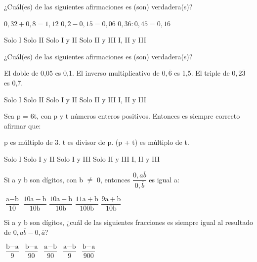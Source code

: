 \documentclass[pagina vacia]{srs}
\begin{document}
\begin{preguntas}[after-item-skip=1cm]
\pregunta ¿Cuál(es) de las siguientes afirmaciones es (son) verdadera(s)?
\begin{verticali}
\alternativa \( 0,32 + 0,8 = 1,12 \)
\alternativa \( 0,2 - 0,1\overline{5} = 0,0\overline{6} \)
\alternativa \( 0,36 : 0,45 = 0,16 \)
\end{verticali}
\begin{vertical}
\alternativa Solo I
\alternativa Solo II
\alternativa Solo I y II
\alternativa Solo II y III
\alternativa I, II y III
\end{vertical}

\pregunta ¿Cuál(es) de las siguientes afirmaciones es (son) verdadera(s)?
\begin{verticali}
\alternativa El doble de 0,05 es 0,1.
\alternativa El inverso multiplicativo de \(0,\overline{6}\) es 1,5.
\alternativa El triple de \(0,2\overline{3}\) es 0,7.
\end{verticali}
\begin{vertical}
\alternativa Solo I
\alternativa Solo II
\alternativa Solo I y II
\alternativa Solo II y III
\alternativa I, II y III
\end{vertical}

\pregunta Sea p = 6t, con p y t números enteros positivos. Entonces es siempre correcto afirmar que:
\begin{verticali}
\alternativa p es múltiplo de 3.
\alternativa t es divisor de p.
\alternativa (p + t) es múltiplo de t.
\end{verticali}
\begin{vertical}
\alternativa Solo I
\alternativa Solo I y II
\alternativa Solo I y III
\alternativa Solo II y III
\alternativa I, II y III
\end{vertical}

\pregunta Si a y b son dígitos, con b \( \neq \) 0, entonces \( \dfrac{0,a\overline{b}}{0,\overline{b}} \) es igual a:
\begin{vertical}
\alternativa \( \dfrac{\text{a} - \text{b}}{10} \)
\alternativa \( \dfrac{10\text{a} - \text{b}}{10\text{b}} \)
\alternativa \( \dfrac{10\text{a} + \text{b}}{10\text{b}} \)
\alternativa \( \dfrac{11\text{a} + \text{b}}{100\text{b}} \)
\alternativa \( \dfrac{9\text{a} + \text{b}}{10\text{b}} \)
\end{vertical}

\pregunta Si a y b son dígitos, ¿cuál de las siguientes fracciones es siempre igual al resultado de \(0,a\overline{b} - 0,\overline{a}\)?
\begin{vertical}
\alternativa \( \dfrac{\text{b} - \text{a}}{9} \)
\alternativa \( \dfrac{\text{b} - \text{a}}{90} \)
\alternativa \( \dfrac{\text{a} - \text{b}}{90} \)
\alternativa \( \dfrac{\text{a} - \text{b}}{9} \)
\alternativa \( \dfrac{\text{b} - \text{a}}{900} \)
\end{vertical}


\end{preguntas}
\end{document}
